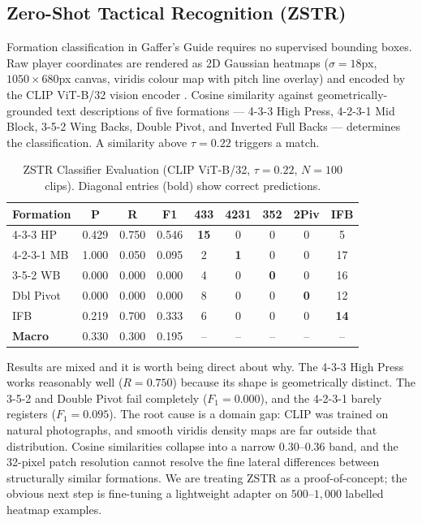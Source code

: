 \documentclass[conference]{IEEEtran}
\begin{document}
\subsection{Zero-Shot Tactical Recognition (ZSTR)}

Formation classification in Gaffer's Guide requires no supervised bounding boxes. Raw player coordinates are rendered as 2D Gaussian heatmaps ($\sigma = 18$px, $1050 \times 680$px canvas, viridis colour map with pitch line overlay) and encoded by the CLIP ViT-B/32 vision encoder \cite{radford2021}. Cosine similarity against geometrically-grounded text descriptions of five formations --- 4-3-3 High Press, 4-2-3-1 Mid Block, 3-5-2 Wing Backs, Double Pivot, and Inverted Full Backs --- determines the classification. A similarity above $\tau = 0.22$ triggers a match.

\begin{table}[!t]
\centering
\caption{ZSTR Classifier Evaluation (CLIP ViT-B/32,
$\tau{=}0.22$, $N{=}100$ clips). Diagonal entries
(bold) show correct predictions.}
\label{tab:zstr_full}
\setlength{\tabcolsep}{3pt}
\begin{tabular}{lcccccccc}
\toprule
\textbf{Formation} & \textbf{P} & \textbf{R} & \textbf{F1}
  & \textbf{433} & \textbf{4231} & \textbf{352}
  & \textbf{2Piv} & \textbf{IFB} \\
\midrule
4-3-3 HP   & 0.429 & 0.750 & 0.546
  & \textbf{15} & 0 & 0 & 0 & 5 \\
4-2-3-1 MB & 1.000 & 0.050 & 0.095
  & 2 & \textbf{1} & 0 & 0 & 17 \\
3-5-2 WB   & 0.000 & 0.000 & 0.000
  & 4 & 0 & \textbf{0} & 0 & 16 \\
Dbl Pivot  & 0.000 & 0.000 & 0.000
  & 8 & 0 & 0 & \textbf{0} & 12 \\
IFB        & 0.219 & 0.700 & 0.333
  & 6 & 0 & 0 & 0 & \textbf{14} \\
\midrule
\textbf{Macro} & 0.330 & 0.300 & 0.195
  & -- & -- & -- & -- & -- \\
\bottomrule
\end{tabular}
\end{table}

Results are mixed and it is worth being direct about why. The 4-3-3 High Press works reasonably well ($R = 0.750$) because its shape is geometrically distinct. The 3-5-2 and Double Pivot fail completely ($F_1 = 0.000$), and the 4-2-3-1 barely registers ($F_1 = 0.095$). The root cause is a domain gap: CLIP was trained on natural photographs, and smooth viridis density maps are far outside that distribution. Cosine similarities collapse into a narrow $0.30$--$0.36$ band, and the 32-pixel patch resolution cannot resolve the fine lateral differences between structurally similar formations. We are treating ZSTR as a proof-of-concept; the obvious next step is fine-tuning a lightweight adapter on $500$--$1{,}000$ labelled heatmap examples.
\end{document}
